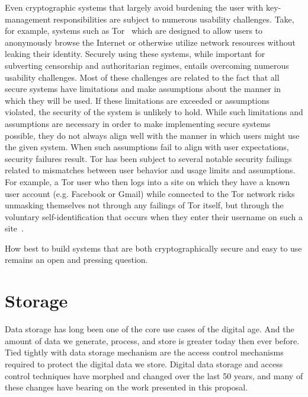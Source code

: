 Even cryptographic systems that largely avoid burdening the user with
key-management responsibilities are subject to numerous usability
challenges. Take, for example, systems such as
Tor~\cite{Dingledine2004} which are designed to allow users to
anonymously browse the Internet or otherwise utilize network resources
without leaking their identity. Securely using these systems, while
important for subverting censorship and authoritarian regimes, entails
overcoming numerous usability challenges. Most of these challenges are
related to the fact that all secure systems have limitations and make
assumptions about the manner in which they will be used. If these
limitations are exceeded or assumptions violated, the security of the
system is unlikely to hold. While such limitations and assumptions are
necessary in order to make implementing secure systems possible, they
do not always align well with the manner in which users might use the
given system. When such assumptions fail to align with user
expectations, security failures result. Tor has been subject to
several notable security failings related to mismatches between user
behavior and usage limits and assumptions. For example, a Tor user who
then logs into a site on which they have a known user account
(e.g. Facebook or Gmail) while connected to the Tor network risks
unmasking themselves not through any failings of Tor itself, but
through the voluntary self-identification that occurs when they enter
their username on such a site~\cite{goodin-dreadpirate}.

How best to build systems that are both cryptographically
secure and easy to use remains an open and pressing question.

\section{Storage}
\label{chap:background:storage}

Data storage has long been one of the core use cases of the digital
age. And the amount of data we generate, process, and store is greater
today then ever before. Tied tightly with data storage mechanism are
the access control mechanisms required to protect the digital data we
store. Digital data storage and access control techniques have morphed
and changed over the last 50 years, and many of these changes have
bearing on the work presented in this proposal.

